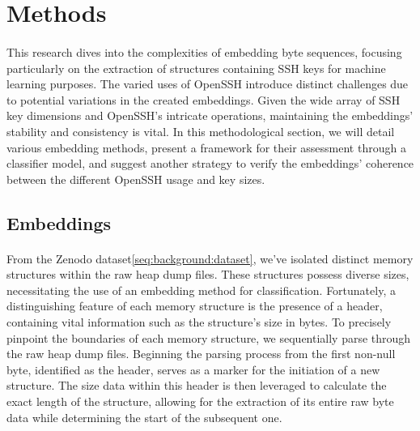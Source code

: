 \section{Methods}\label{chap:methods}
    \paragraph{}This research dives into the complexities of embedding byte sequences, focusing particularly on the extraction of structures containing SSH keys for machine learning purposes. The varied uses of OpenSSH introduce distinct challenges due to potential variations in the created embeddings. Given the wide array of SSH key dimensions and OpenSSH's intricate operations, maintaining the embeddings' stability and consistency is vital. In this methodological section, we will detail various embedding methods, present a framework for their assessment through a classifier model, and suggest another strategy to verify the embeddings' coherence between the different OpenSSH usage and key sizes.

    
    \subsection{Embeddings}
    \paragraph{}From the Zenodo dataset\ref{seq:background:dataset}, we've isolated distinct memory structures within the raw heap dump files. These structures possess diverse sizes, necessitating the use of an embedding method for classification. Fortunately, a distinguishing feature of each memory structure is the presence of a header, containing vital information such as the structure's size in bytes. To precisely pinpoint the boundaries of each memory structure, we sequentially parse through the raw heap dump files. Beginning the parsing process from the first non-null byte, identified as the header, serves as a marker for the initiation of a new structure. The size data within this header is then leveraged to calculate the exact length of the structure, allowing for the extraction of its entire raw byte data while determining the start of the subsequent one.
    

